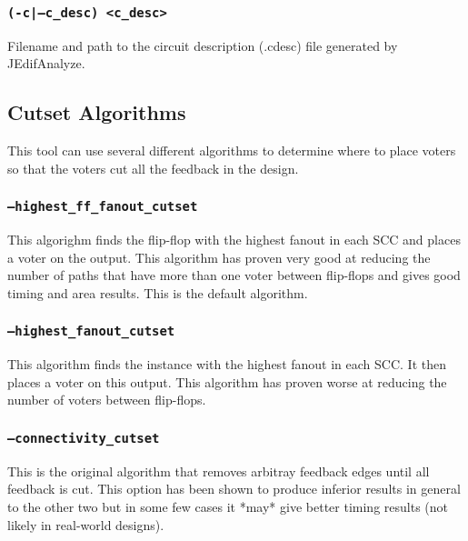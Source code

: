 \subsubsection{\texttt{(-c|--c\_desc) <c\_desc>}}
Filename and path to the circuit description (.cdesc) file generated by
JEdifAnalyze.

\subsection{Cutset Algorithms}
This tool can use several different algorithms to determine where to place
voters so that the voters cut all the feedback in the design. 

\subsubsection{\texttt{--highest\_ff\_fanout\_cutset}}
This algorighm finds the flip-flop with the highest fanout in each SCC and 
places a voter on the output. This algorithm has proven very good at reducing 
the number of paths that have more than one voter between flip-flops and gives
good timing and area results. This is the default algorithm.

\subsubsection{\texttt{--highest\_fanout\_cutset}}
This algorithm finds the instance with the highest fanout in each SCC.
It then places a voter on this output. This algorithm has proven worse 
at reducing the number of voters between flip-flops.

\subsubsection{\texttt{--connectivity\_cutset}}
This is the original algorithm that removes arbitray feedback edges until all
feedback is cut. This option has been shown to produce inferior results in
general to the other two but in some few cases it *may* give better timing
results (not likely in real-world designs).




